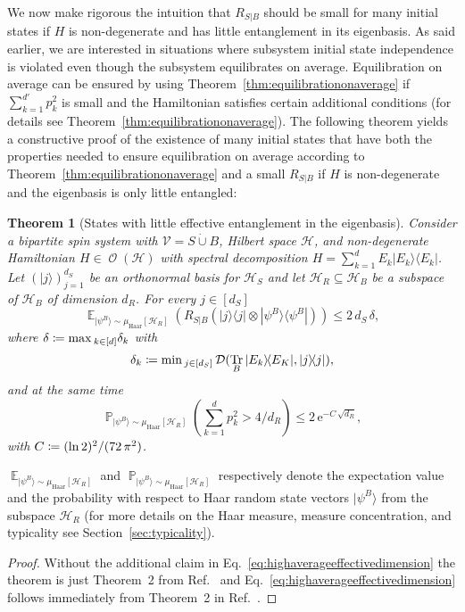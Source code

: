 \documentclass[a4paper,12pt,listof=totoc,index=totoc,bibliography=totoc,headsepline=false,headings=normal,BCOR16.153846mm,DIV12,headinclude,twoside,cleardoublepage=empty,numbers=noenddot,final]{scrreprt}
\theoremstyle{mystyle}
\numberwithin{equation}{section}
\numberwithin{figure}{section}
\numberwithin{lemma}{section}
\newtheorem{theorem}{Theorem}
\numberwithin{theorem}{section}
\numberwithin{corollary}{section}
\numberwithin{definition}{section}
\numberwithin{conjecture}{section}
\numberwithin{observation}{section}
\newcommand{\+}{\mkern2mu}
\newcommand{\coloneqq}{\mathrel{\vcentcolon\mkern-1.2mu=}} %
\newcommand{\dunion}{\mathbin{\dot{\cup}}}
\newcommand{\texteqref}[1]{Eq.~\eqref{#1}}
\renewcommand{\max}{\mathchoice{\operatorname*{max}}{\operatorname*{max}}{\mathrm{max}}{\mathrm{max}}} %
\renewcommand{\min}{\mathchoice{\operatorname*{min}}{\operatorname*{min}}{\mathrm{min}}{\mathrm{min}}}
\renewcommand{\H}{H}
\newcommand{\muhaar}{\mu_{\mathrm{Haar}}}
\newcommand{\Vset}{\mathcal{V}}
\newcommand{\bra}[1]{\langle #1|}
\newcommand{\ket}[1]{|#1\rangle}
\newcommand{\ketbra}[2]{\ket{#1}\!\bra{#2}}
\newcommand{\tracedistance}[3][]{
  \ifthenelse{\equal{#2}{}}
  {\ifthenelse{\equal{#3}{}}
    {\mathcal{D}_{#1}}{}
  }{
    \ifthenelse{\equal{#1}{}}
    {\operatorname{\mathcal{D}}(#2,#3)}
    {\operatorname{\mathcal{D}}_{#1}(#2,#3)}
  }
}
\DeclareMathOperator*{\probability}{\mathbb{P}}
\DeclareMathOperator*{\expectation}{\mathbb{E}}
\newcommand{\e}{\mathrm{e}}
\DeclareMathOperator{\1}{\mathds{1}}
\DeclareMathOperator{\Obs}{\mathcal{O}}
\DeclareMathOperator{\Tr}{Tr}
\newcommand{\mc}[1]{\mathcal{#1}}
\newcommand{\mcH}{\mc{H}}
\begin{document}
We now make rigorous the intuition that $R_{S|B}$ should be small for many initial states if $\H$ is non-degenerate and has little entanglement in its eigenbasis.
As said earlier, we are interested in situations where subsystem initial state independence is violated even though the subsystem equilibrates on average.
Equilibration on average can be ensured by using Theorem~\ref{thm:equilibrationonaverage} if $\sum_{k=1}^{d'} p_k^2$ is small and the Hamiltonian satisfies certain additional conditions (for details see Theorem~\ref{thm:equilibrationonaverage}).
The following theorem yields a constructive proof of the existence of many initial states that have both the properties needed to ensure equilibration on average according to Theorem~\ref{thm:equilibrationonaverage} and a small $R_{S|B}$ if $\H$ is non-degenerate and the eigenbasis is only little entangled:
\begin{theorem}[States with little effective entanglement in the eigenbasis] \label{thm:entanglementintheeigenbasis}
  Consider a bipartite spin system with $\Vset = S \dunion B$, Hilbert space $\mcH$, and non-degenerate Hamiltonian $\H \in \Obs(\mcH)$ with spectral decomposition $\H = \sum_{k=1}^d E_k \ketbra{E_k}{E_k}$.
  Let $(\ket{j})_{j=1}^{d_S}$ be an orthonormal basis for $\mcH_S$ and let $\mcH_R \subseteq \mcH_B$ be a subspace of $\mcH_B$ of dimension $d_R$.
  For every $j \in [d_S]$
  \begin{equation} \label{eq:averageeffectiveentanglementintheeigenbasisbound}
    \expectation_{\ket{\psi^B}\sim\muhaar[\mcH_R]}\left( R_{S|B}( \ketbra{j}{j} \otimes \ketbra{\psi^B}{\psi^B} ) \right) \leq 2\,d_S\,\delta ,
  \end{equation}
  where $\delta \coloneqq \max_{k\in[d]} \delta_k$ with
  \begin{equation} \label{eq:geometricentanglementdelta}
     \delta_k \coloneqq \min_{j\in [d_S]} \tracedistance{\Tr_B \ketbra{E_k}{E_K}}{\ketbra{j}{j}} ,
  \end{equation}
  and at the same time
  \begin{equation} \label{eq:highaverageeffectivedimension}
    \probability_{\ket{\psi^B}\sim\muhaar[\mcH_R]}\left( \sum_{k=1}^{d} p_k^2 > 4/d_R \right) \leq 2\,\e^{-C\,\sqrt{d_R}} ,
  \end{equation}
  with $C \coloneqq (\ln 2)^2/(72\,\pi^2)$.
\end{theorem}
$\expectation_{\ket{\psi^B}\sim\muhaar[\mcH_R]}$ and $\probability_{\ket{\psi^B}\sim\muhaar[\mcH_R]}$ respectively denote the expectation value and the probability with respect to Haar random state vectors $\ket{\psi^B}$ from the subspace $\mcH_R$ (for more details on the Haar measure, measure concentration, and typicality see Section~\ref{sec:typicality}).
\begin{proof}
  Without the additional claim in \texteqref{eq:highaverageeffectivedimension} the theorem is just Theorem~2 from Ref.~\cite{PhysRevLett.10-6} and \texteqref{eq:highaverageeffectivedimension} follows immediately from Theorem~2 in Ref.~\cite{Linden09}.
\end{proof}
\end{document}
